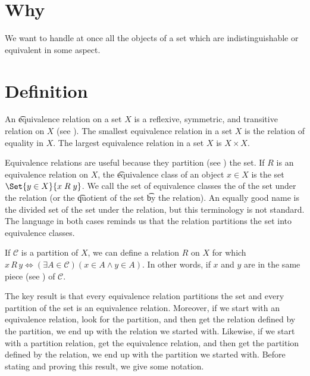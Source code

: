 
\section*{Why}

We want to handle at once all the objects of a set which are indistinguishable or equivalent in some aspect.

\section*{Definition}

An \t{equivalence relation} on a set $X$ is a reflexive, symmetric, and transitive relation on $X$ (see ).
The smallest equivalence relation in a set $X$ is the relation of equality in $X$.
The largest equivalence relation in a set $X$ is $X \times X$.

Equivalence relations are useful because they partition (see ) the set.
If $R$ is an equivalence relation on $X$, the \t{equivalence class} of an object $x \in X$ is the set $\Set{y \in X}{x\;R\;y}$.
We call the set of equivalence classes the  of the set under the relation (or the \t{quotient} of the set \t{by the relation}).
An equally good name is the divided set of the set under the relation, but this terminology is not standard.
The language in both cases reminds us that the relation partitions the set into equivalence classes.

If $\mathcal{C} $ is a partition of $X$, we can define a relation $R$ on $X$ for which $x\,R\,y \iff (\exists A \in \mathcal{C} )(x \in A \land y \in A)$.
In other words, if $x$ and $y$ are in the same piece (see ) of $\mathcal{C} $.

The key result is that every equivalence relation partitions the set and every partition of the set is an equivalence relation.
Moreover, if we start with an equivalence relation, look for the partition, and then get the relation defined by the partition, we end up with the relation we started with.
Likewise, if we start with a partition relation, get the equivalence relation, and then get the partition defined by the relation, we end up with the partition we started with.
Before stating and proving this result, we give some notation.

